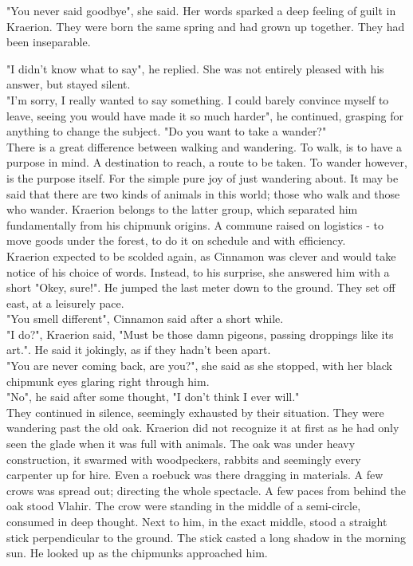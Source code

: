 \documentclass[smalldemyvopaper,11pt,twoside,onecolumn,openright,extrafontsizes]{memoir}
\newlength\drop
\begin{document}
"You never said goodbye", she said. Her words sparked a deep feeling of guilt in Kraerion. They were born the same spring and had grown up together. They had been inseparable. 

"I didn't know what to say", he replied. She was not entirely pleased with his answer, but stayed silent.\\

"I'm sorry, I really wanted to say something. I could barely convince myself to leave, seeing you would have made it so much harder", he continued, grasping for anything to change the subject. "Do you want to take a wander?" \\ 


There is a great difference between walking and wandering. To walk, is to have a purpose in mind. A destination to reach, a route to be taken. To wander however, is the purpose itself. For the simple pure joy of just wandering about. It may be said that there are two kinds of animals in this world; those who walk and those who wander. Kraerion belongs to the latter group, which separated him fundamentally from his chipmunk origins. A commune raised on logistics - to move goods under the forest, to do it on schedule and with efficiency. \\

Kraerion expected to be scolded again, as Cinnamon was clever and would take notice of his choice of words. Instead, to his surprise, she answered him with a short "Okey, sure!". He jumped the last meter down to the ground. They set off east, at a leisurely pace. \\

"You smell different", Cinnamon said after a short while.\\

"I do?", Kraerion said, "Must be those damn pigeons, passing droppings like its art.". He said it jokingly, as if they hadn't been apart. \\

"You are never coming back, are you?", she said as she stopped, with her black chipmunk eyes glaring right through him. \\

"No", he said after some thought, "I don't think I ever will."\\

They continued in silence, seemingly exhausted by their situation. They were wandering past the old oak. Kraerion did not recognize it at first as he had only seen the glade when it was full with animals. The oak was under heavy construction, it swarmed with woodpeckers, rabbits and seemingly every carpenter up for hire. Even a roebuck was there dragging in materials. A few crows was spread out; directing the whole spectacle. A few paces from behind the oak stood Vlahir. The crow were standing in the middle of a semi-circle, consumed in deep thought. Next to him, in the exact middle, stood a straight stick perpendicular to the ground. The stick casted a long shadow in the morning sun. He looked up as the chipmunks approached him. 
\end{document}
